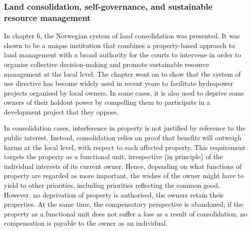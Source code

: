 
\subsubsection*{Land consolidation, self-governance, and sustainable resource management}

In chapter 6, the Norwegian system of land consolidation was presented. It was shown to be a unique institution that combines a property-based approach to land management with a broad authority for the courts to intervene in order to organise collective decision-making and promote sustainable resource management at the local level. The chapter went on to show that the system of use directive has become widely used in recent years to facilitate hydropower projects organised by local owners. In some cases, it is also used to deprive some owners of their holdout power by compelling them to participate in a development project that they oppose.

In consolidation cases, interference in property is not justified by reference to the public interest. Instead, consolidation relies on proof that benefits will outweigh harms at the local level, with respect to each affected property. This requirement targets the property as a functional unit, irrespective (in principle) of the individual interests of its current owner. Hence, depending on what functions of property are regarded as more important, the wishes of the owner might have to yield to other priorities, including priorities reflecting the common good. However, no deprivation of property is authorised, the owners retain their properties. At the same time, the compensatory perspective is abandoned; if the property as a functional unit does not suffer a loss as a result of consolidation, no compensation is payable to the owner as an individual.

